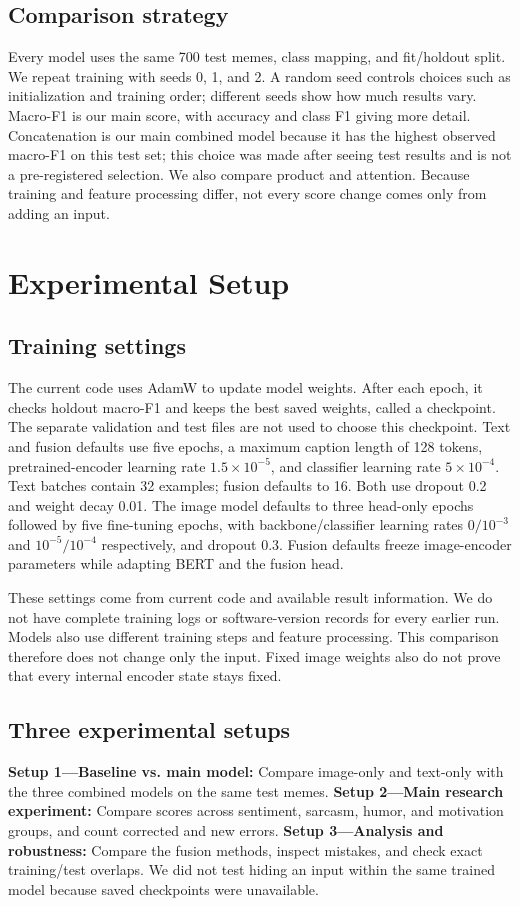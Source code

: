 \documentclass[11pt,a4paper]{article}
\begin{document}
\subsection{Comparison strategy}
Every model uses the same 700 test memes, class mapping, and fit/holdout split. We repeat training with seeds 0, 1, and 2. A random seed controls choices such as initialization and training order; different seeds show how much results vary. Macro-F1 is our main score, with accuracy and class F1 giving more detail. Concatenation is our main combined model because it has the highest observed macro-F1 on this test set; this choice was made after seeing test results and is not a pre-registered selection. We also compare product and attention. Because training and feature processing differ, not every score change comes only from adding an input.

\section{Experimental Setup}
\label{sec:experiments}

\subsection{Training settings}
The current code uses AdamW to update model weights. After each epoch, it checks holdout macro-F1 and keeps the best saved weights, called a checkpoint. The separate validation and test files are not used to choose this checkpoint. Text and fusion defaults use five epochs, a maximum caption length of 128 tokens, pretrained-encoder learning rate $1.5\times10^{-5}$, and classifier learning rate $5\times10^{-4}$. Text batches contain 32 examples; fusion defaults to 16. Both use dropout 0.2 and weight decay 0.01. The image model defaults to three head-only epochs followed by five fine-tuning epochs, with backbone/classifier learning rates $0/10^{-3}$ and $10^{-5}/10^{-4}$ respectively, and dropout 0.3. Fusion defaults freeze image-encoder parameters while adapting BERT and the fusion head.

These settings come from current code and available result information. We do not have complete training logs or software-version records for every earlier run. Models also use different training steps and feature processing. This comparison therefore does not change only the input. Fixed image weights also do not prove that every internal encoder state stays fixed.

\subsection{Three experimental setups}
\textbf{Setup 1---Baseline vs. main model:} Compare image-only and text-only with the three combined models on the same test memes. \textbf{Setup 2---Main research experiment:} Compare scores across sentiment, sarcasm, humor, and motivation groups, and count corrected and new errors. \textbf{Setup 3---Analysis and robustness:} Compare the fusion methods, inspect mistakes, and check exact training/test overlaps. We did not test hiding an input within the same trained model because saved checkpoints were unavailable.
\end{document}
